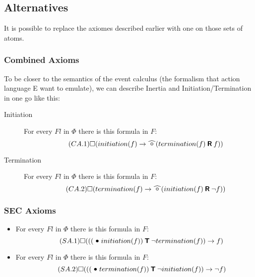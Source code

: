 \subsection{Alternatives}

It is possible to replace the axiomes described earlier with one on those sets of atoms.

\subsubsection{Combined Axioms}

To be closer to the semantics of the event calculus (the formalism that action language E want to emulate), we can describe Inertia and Initiation/Termination in one go like this:
\begin{description}
  \item[Initiation]
  For every $Fl$ in $\Phi$ there is this formula in $F$:
  \begin{equation}\tag{$CA.1$}
    \alwaysF(initiation(f)\rightarrow\wnext(termination(f) \release f))
  \end{equation}
  \item[Termination]
  For every $Fl$ in $\Phi$ there is this formula in $F$:
  \begin{equation}\tag{$CA.2$}
    \alwaysF(termination(f)\rightarrow\wnext(initiation(f) \release \neg f))
  \end{equation}
\end{description}

\subsubsection{SEC Axioms}

\begin{itemize}
  \item
    For every $Fl$ in $\Phi$ there is this formula in $F$:
    \begin{equation}\tag{$SA.1$}
      \alwaysF(((\previous initiation(f)) \trigger \neg termination(f)) \rightarrow f)
    \end{equation}
  \item
    For every $Fl$ in $\Phi$ there is this formula in $F$:
    \begin{equation}\tag{$SA.2$}
      \alwaysF(((\previous termination(f)) \trigger \neg initiation(f)) \rightarrow \neg f)
    \end{equation}
\end{itemize}

